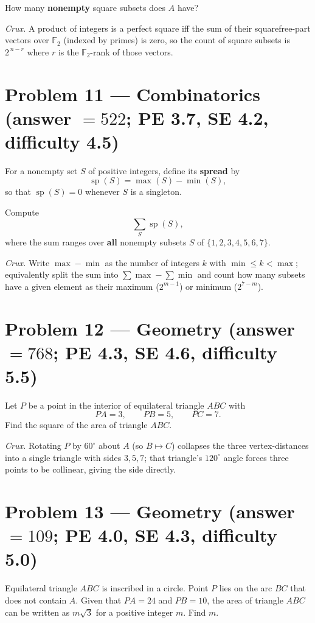 \documentclass[11pt]{article}
\begin{document}
How many \textbf{nonempty} square subsets does $A$ have?

\medskip

\textit{Crux.} A product of integers is a perfect square iff the sum of their squarefree-part vectors over $\mathbb{F}_2$ (indexed by primes) is zero, so the count of square subsets is $2^{\,n-r}$ where $r$ is the $\mathbb{F}_2$-rank of those vectors.

\section*{Problem 11 --- Combinatorics \quad (answer $=522$; PE 3.7, SE 4.2, difficulty 4.5)}

For a nonempty set $S$ of positive integers, define its \textbf{spread} by
$$\operatorname{sp}(S)=\max(S)-\min(S),$$
so that $\operatorname{sp}(S)=0$ whenever $S$ is a singleton.

Compute
$$\sum_{S}\operatorname{sp}(S),$$
where the sum ranges over \textbf{all} nonempty subsets $S$ of $\{1,2,3,4,5,6,7\}$.

\medskip

\textit{Crux.} Write $\max-\min$ as the number of integers $k$ with $\min\le k<\max$; equivalently split the sum into $\sum\max-\sum\min$ and count how many subsets have a given element as their maximum ($2^{m-1}$) or minimum ($2^{7-m}$).

\section*{Problem 12 --- Geometry \quad (answer $=768$; PE 4.3, SE 4.6, difficulty 5.5)}

Let $P$ be a point in the interior of equilateral triangle $ABC$ with
$$PA = 3, \qquad PB = 5, \qquad PC = 7.$$
Find the square of the area of triangle $ABC$.

\medskip

\textit{Crux.} Rotating $P$ by $60^\circ$ about $A$ (so $B\mapsto C$) collapses the three vertex-distances into a single triangle with sides $3,5,7$; that triangle's $120^\circ$ angle forces three points to be collinear, giving the side directly.

\section*{Problem 13 --- Geometry \quad (answer $=109$; PE 4.0, SE 4.3, difficulty 5.0)}

Equilateral triangle $ABC$ is inscribed in a circle. Point $P$ lies on the arc $BC$ that does not contain $A$. Given that $PA = 24$ and $PB = 10$, the area of triangle $ABC$ can be written as $m\sqrt{3}$ for a positive integer $m$. Find $m$.
\end{document}
